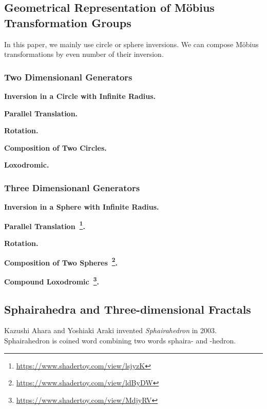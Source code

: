 \subsection{Geometrical Representation of M\"obius Transformation Groups}


In this paper, we mainly use circle or sphere inversions.
We can compose M\"obius transformations by even number of their
inversion.


\subsubsection{Two Dimensionanl Generators}

\noindent\textbf{Inversion in a Circle with Infinite Radius.}

\noindent\textbf{Parallel Translation.}

\noindent\textbf{Rotation.}

\noindent\textbf{Composition of Two Circles.}

\noindent\textbf{Loxodromic.}


\subsubsection{Three Dimensionanl Generators}

\noindent\textbf{Inversion in a Sphere with Infinite Radius.}

\noindent\textbf{Parallel
Translation~\footnote{\url{https://www.shadertoy.com/view/lsjyzK}}.}

\noindent\textbf{Rotation.}

\noindent\textbf{Composition of Two Spheres~\footnote{\url{https://www.shadertoy.com/view/ldByDW}}.}

\noindent\textbf{Compound Loxodromic~\footnote{\url{https://www.shadertoy.com/view/MdjyRV}}.}

\subsection{Sphairahedra and Three-dimensional Fractals}


Kazushi Ahara and Yoshiaki Araki invented \textit{Sphairahedron} in
2003.
Sphairahedron is coined word combining two words sphaira- and -hedron.